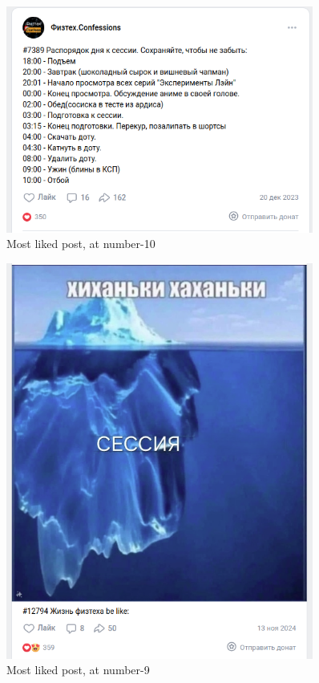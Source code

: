\documentclass[
	12pt
] {article}
\begin{document}
	\newpage	
	\vspace*{\fill}
	\begin{figure}[H]
		\centering
		\includegraphics[width=0.9\textwidth]{fig-top-posts-10}
		\caption{Most liked post, at number-10}
		\label{fig-top-posts-10}
	\end{figure}
	\vfill
	
	\newpage	
	\vspace*{\fill}
	\begin{figure}[H]
		\centering
		\includegraphics[width=0.9\textwidth]{fig-top-posts-9}
		\caption{Most liked post, at number-9}
		\label{fig-top-posts-9}
	\end{figure}
	\vfill
	
\end{document}
